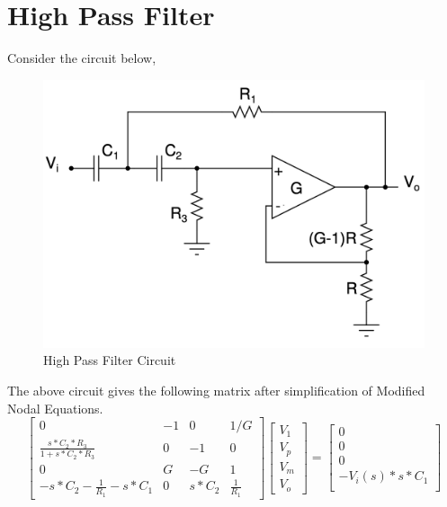 \documentclass[11pt, a4paper]{article}
\begin{document}
\section{High Pass Filter}
Consider the circuit below,
\begin{figure}[!tbh]
   	\centering
   	\includegraphics[scale=0.5]{high_pass.png}   
   	\caption{High Pass Filter Circuit}
   	\label{fig:Figure_1}
   \end{figure}
The above circuit gives the following matrix after simplification of Modified Nodal Equations.
\begin{equation*}
    \begin{bmatrix}
    0   & -1 & 0  & 1/G \\
    \frac{s*C_2*R_3}{1+s*C_2*R_3}  & 0 & -1 & 0\\
    0  & G & -G & 1 \\
    -s*C_2 - \frac{1}{R_1} - s*C_1 & 0 & s*C_2 & \frac{1}{R_1}
\end{bmatrix}
\begin{bmatrix}
    V_1\\
    V_p\\
    V_m \\
    V_o
\end{bmatrix}
=
\begin{bmatrix}
    0 \\
    0 \\
    0 \\
    -V_i(s)*s*C_1 \\
    
\end{bmatrix}
\end{equation*}
\end{document}
